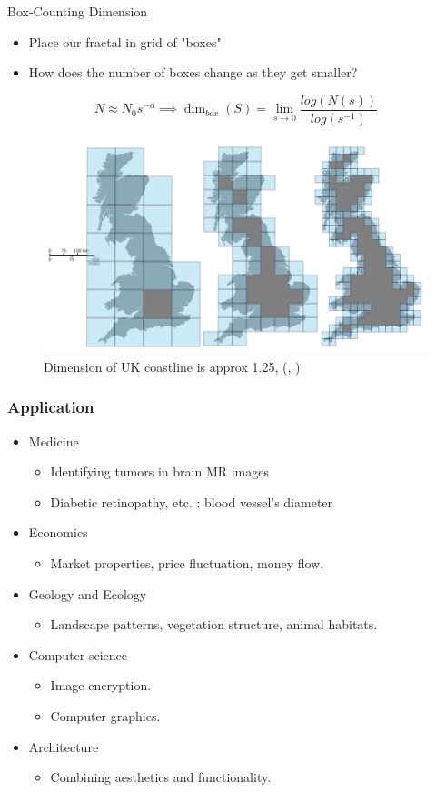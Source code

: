 \begin{frame}{Box-Counting Dimension}
	\begin{itemize}
		\item Place our fractal in grid of "boxes"
		\item How does the number of boxes change as they get smaller?
	\end{itemize}
	
	\begin{center}
		\[N \approx N_0s^{-d} \implies \dim_{box}(S) = \lim_{s \to 0}\frac{log (N(s))}{log(s^{-1})}\] 
	\end{center}
	\begin{figure}
		\centering
		\includegraphics[width=0.25\linewidth]{MichaelImages/Great_Britain_Box.svg.png}
		\caption{Dimension of UK coastline is approx 1.25, (\cite{Mandelbrot1983}, \cite{boxDimensionWiki})}
		\label{fig:enter-label}
	\end{figure}
\end{frame}

\begin{frame}
	\frametitle{Application}
	\begin{itemize}
		\item Medicine
		\begin{itemize}
			\item Identifying tumors in brain MR images \cite{iftekharuddin2003fractal}
			\item Diabetic retinopathy, etc. : blood vessel's diameter \cite{uahabi2015applications}
		\end{itemize}
		\item Economics
		\begin{itemize}
			\item Market properties, price fluctuation, money flow. \cite{takayasu2009fractals}
		\end{itemize}
		\item Geology and Ecology
		\begin{itemize}
			\item Landscape patterns, vegetation structure, animal habitats. \cite{LOEHLE1996271}
		\end{itemize}
		\item Computer science
		\begin{itemize}
			\item Image encryption. \cite{sangavi2019image}
			\item Computer graphics. \cite{sala2021fractal}
		\end{itemize}
		\item Architecture
		\begin{itemize}
			\item Combining aesthetics and functionality. \cite{lorenz2002fractals}
		\end{itemize}
	\end{itemize}
\end{frame}

